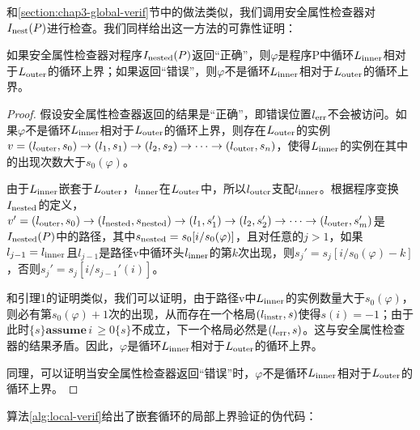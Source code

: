 和\ref{section:chap3-global-verif}节中的做法类似，我们调用安全属性检查器对$I_{\operatorname{nest}}
(P)$进行检查。我们同样给出这一方法的可靠性证明：

\begin{lemma}
  如果安全属性检查器对程序$I_{\operatorname{nested}}
  (P)$返回“正确”，则$\varphi$是程序P中循环$L_{\operatorname{inner}}$相对于$L_{\operatorname{outer}}$的循环上界；如果返回“错误”，则$\varphi$不是循环$L_{\operatorname{inner}}$相对于$L_{\operatorname{outer}}$的循环上界。
\end{lemma}

\begin{proof}
  
  
  假设安全属性检查器返回的结果是“正确”，即错误位置$l_{\operatorname{err}}$不会被访问。如果$\varphi$不是循环$L_{\operatorname{inner}}$相对于$L_{\operatorname{outer}}$的循环上界，则存在$L_{\operatorname{outer}}$的实例$v
  = (l_{\operatorname{outer}}, s_0) \rightarrow (l_1, s_1) \rightarrow (l_2, s_2)
  \rightarrow \cdots \rightarrow (l_{\operatorname{outer}},
  s_n)$，使得$L_{\operatorname{inner}}$的实例在其中的出现次数大于$s_0
  (\varphi)$。
  
  由于$L_{\operatorname{inner}}$嵌套于$L_{\operatorname{outer}}$，$l_{\operatorname{inner}}$在$L_{\operatorname{outer}}$中，所以$l_{\operatorname{outer}}$支配$l_{\operatorname{inner}}$。根据程序变换$I_{\operatorname{nested}}$的定义，$v'
  = (l_{\operatorname{outer}}, s_0) \rightarrow (l_{\operatorname{nested}}, s_{\operatorname{nested}})
  \rightarrow (l_1, s_1') \rightarrow (l_2, s_2') \rightarrow \cdots
  \rightarrow (l_{\operatorname{outer}}, s_m')$是$I_{\operatorname{nested}}
  (P)$中的路径，其中$s_{\operatorname{nested}} = s_0 [i / s_0
  (\varphi)]$，且对任意的$j > 1$，如果$l_{j - 1} =
  l_{\operatorname{inner}}$且$l_{j -
  1}$是路径v中循环头$l_{\operatorname{inner}}$的第$k$次出现，则$s_j' =
  s_j [i / s_0 (\varphi) - k]$，否则$s_j' = s_j [i / s_{j - 1}' (i)]$。
  
  和引理1的证明类似，我们可以证明，由于路径v中$L_{\operatorname{inner}}$的实例数量大于$s_0
  (\varphi)$，则必有第$s_0 (\varphi) +
  1$次的出现，从而存在一个格局$(l_{\operatorname{instr}}, s)$使得$s (i)
  = - 1$；由于此时$\{ s \} \textbf{assume} \, i \, \geqslant 0 \{ s
  \}$不成立，下一个格局必然是$(l_{\operatorname{err}},
  s)$。这与安全属性检查器的结果矛盾。因此，$\varphi$是循环$L_{\operatorname{inner}}$相对于$L_{\operatorname{outer}}$的循环上界。
  
  同理，可以证明当安全属性检查器返回“错误”时，$\varphi$不是循环$L_{\operatorname{inner}}$相对于$L_{\operatorname{outer}}$的循环上界。
\end{proof}

算法\ref{alg:local-verif}给出了嵌套循环的局部上界验证的伪代码：

